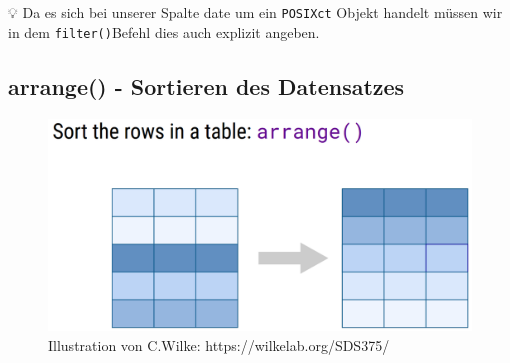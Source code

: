 \documentclass[
]{article}
\begin{document}
💡 Da es sich bei unserer Spalte date um ein \texttt{POSIXct} Objekt handelt müssen wir in dem \texttt{filter()}Befehl dies auch explizit angeben.

\hypertarget{arrange---sortieren-des-datensatzes}{%
\subsection{arrange() - Sortieren des Datensatzes}\label{arrange---sortieren-des-datensatzes}}

\begin{figure}

{\centering \includegraphics[width=1\linewidth]{images/038} 

}

\caption{Illustration von C.Wilke: https://wilkelab.org/SDS375/}\label{fig:unnamed-chunk-134}
\end{figure}
\end{document}
